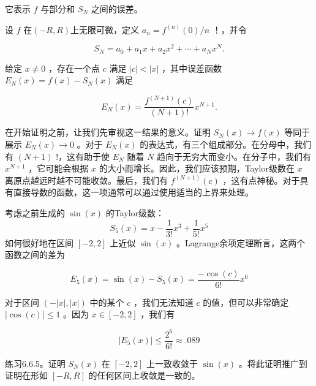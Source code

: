 它表示 \(f\) 与部分和 \({S}_{N}\) 之间的误差。

\begin{Thm}[Lagrange余项]
  \label{thm:6.6.1}
设 \(f\) 在$(-R, R)$上无限可微，定义 \({a}_{n} = {f}^{\left( n\right) }\left( 0\right) /n\) ！，并令

\[
{S}_{N} = {a}_{0} + {a}_{1}x + {a}_{2}{x}^{2} + \cdots  + {a}_{N}{x}^{N}.
\]

给定 \(x \neq  0\) ，存在一个点 \(c\) 满足 \(\left| c\right|  < \left| x\right|\) ，其中误差函数 \({E}_{N}\left( x\right)  = f\left( x\right)  - {S}_{N}\left( x\right)\) 满足

\[
{E}_{N}\left( x\right)  = \frac{{f}^{\left( N + 1\right) }\left( c\right) }{\left( {N + 1}\right) !}{x}^{N + 1}.
\]

\end{Thm}

在开始证明之前，让我们先审视这一结果的意义。证明 \({S}_{N}\left( x\right)  \rightarrow  f\left( x\right)\) 等同于展示 \({E}_{N}\left( x\right)  \rightarrow  0\) 。对于 \({E}_{N}\left( x\right)\) 的表达式，有三个组成部分。在分母中，我们有 \(\left( {N + 1}\right)\) !，这有助于使 \({E}_{N}\) 随着 \(N\) 趋向于无穷大而变小。在分子中，我们有 \({x}^{N + 1}\) ，它可能会根据 \(x\) 的大小而增长。因此，我们应该预期，Taylor级数在 \(x\) 离原点越远时越不可能收敛。最后，我们有 \({f}^{\left( N + 1\right) }\left( c\right)\) ，这有点神秘。对于具有直接导数的函数，这一项通常可以通过使用适当的上界来处理。


\begin{Eg}
  \label{eg:6.6.2}
  考虑之前生成的 \(\sin \left( x\right)\) 的Taylor级数：
\[
{S}_{5}\left( x\right)  = x - \frac{1}{3!}{x}^{3} + \frac{1}{5!}{x}^{5}
\]
  如何很好地在区间 \(\left\lbrack  {-2,2}\right\rbrack\) 上近似 \(\sin \left( x\right)\) 。Lagrange余项定理断言，这两个函数之间的差为

\[
{E}_{5}\left( x\right)  = \sin \left( x\right)  - {S}_{5}\left( x\right)  = \frac{-\cos \left( c\right) }{6!}{x}^{6}
\]

对于区间 \(\left( {-\left| x\right| ,\left| x\right| }\right)\) 中的某个 \(c\) ，我们无法知道 \(c\) 的值，但可以非常确定 \(\left| {\cos \left( c\right) }\right|  \leq  1\) 。因为 \(x \in  \left\lbrack  {-2,2}\right\rbrack\) ，我们有

\[
\left| {{E}_{5}\left( x\right) }\right|  \leq  \frac{{2}^{6}}{6!} \approx  {.089}
\]  
\end{Eg}

练习6.6.5。证明 \({S}_{N}\left( x\right)\) 在 \(\left\lbrack  {-2,2}\right\rbrack\) 上一致收敛于 \(\sin \left( x\right)\) 。将此证明推广到证明在形如 \(\left\lbrack  {-R,R}\right\rbrack\) 的任何区间上收敛是一致的。

